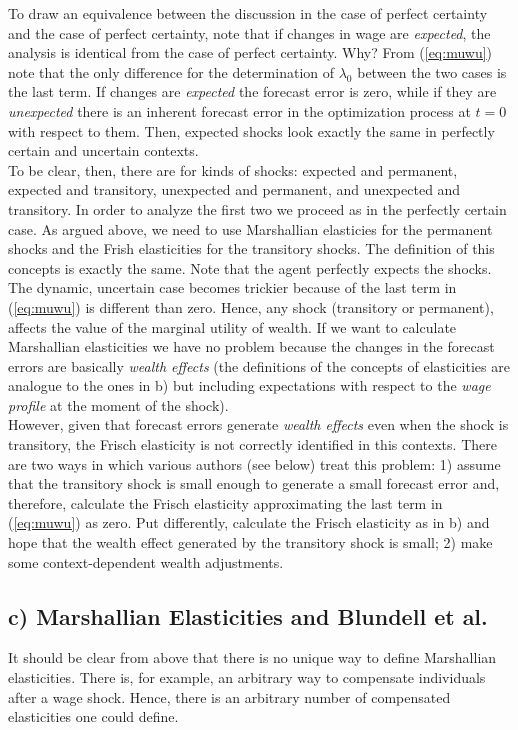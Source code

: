 \documentclass[11pt]{article}
\begin{document}
To draw an equivalence between the discussion in the case of perfect certainty and the case of perfect certainty, note that if changes in wage are \textit{expected}, the analysis is identical from the case of perfect certainty. Why? From (\ref{eq:muwu}) note that the only difference for the determination of $\lambda_{0}$ between the two cases is the last term. If changes are \textit{expected} the forecast error is zero, while if they are \textit{unexpected} there is an inherent forecast error in the optimization process at $t=0$ with respect to them. Then, expected shocks look exactly the same in perfectly certain and uncertain contexts.\\
\indent To be clear, then, there are for kinds of shocks: expected and permanent, expected and transitory, unexpected and permanent, and unexpected and transitory. In order to analyze the first two we proceed as in the perfectly certain case. As argued above, we need to use Marshallian elasticies for the permanent shocks and the Frish elasticities for the transitory shocks. The definition of this concepts is exactly the same. Note that the agent perfectly expects the shocks. \\
\indent The dynamic, uncertain case becomes trickier because of the last term in (\ref{eq:muwu}) is different than zero. Hence, any shock (transitory or permanent), affects the value of the marginal utility of wealth. If we want to calculate Marshallian elasticities we have no problem because the changes in the forecast errors are basically \textit{wealth effects} (the definitions of the concepts of elasticities are analogue to the ones in b) but including expectations with respect to the \textit{wage profile} at the moment of the shock). \\
\indent However, given that forecast errors generate \textit{wealth effects} even when the shock is transitory, the Frisch elasticity is not correctly identified in this contexts. There are two ways in which various authors (see below) treat this problem: 1) assume that the transitory shock is small enough to generate a small forecast error and, therefore, calculate the Frisch elasticity approximating the last term in (\ref{eq:muwu}) as zero. Put differently, calculate the Frisch elasticity as in b) and hope that the wealth effect generated by the transitory shock is small; 2) make some context-dependent wealth adjustments. 

\subsection*{c) Marshallian Elasticities and Blundell et al.}   
It should be clear from above that there is no unique way to define Marshallian elasticities. There is, for example, an arbitrary way to compensate individuals after a wage shock. Hence, there is an arbitrary number of compensated elasticities one could define. 
\end{document}
